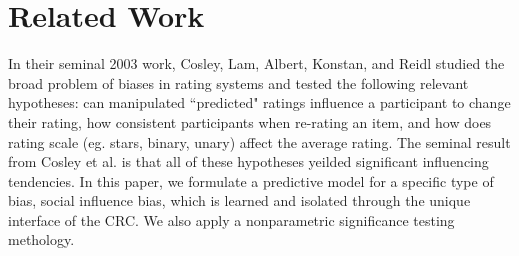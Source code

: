 \section{Related Work}


In their seminal 2003 work, Cosley, Lam, Albert, Konstan, and Reidl \cite{cosley2003seeing} studied the broad problem of biases in rating systems and tested the following relevant hypotheses:  can manipulated ``predicted" ratings influence a participant to change their rating, how consistent participants when re-rating an item, and how does rating scale (eg. stars, binary, unary) affect the average rating. 
The seminal result from Cosley et al. is that all of these hypotheses yeilded significant influencing tendencies.
In this paper, we formulate a predictive model for a specific type of bias, social influence bias, which is learned and isolated through the unique interface of the CRC. 
We also apply a nonparametric significance testing methology.

